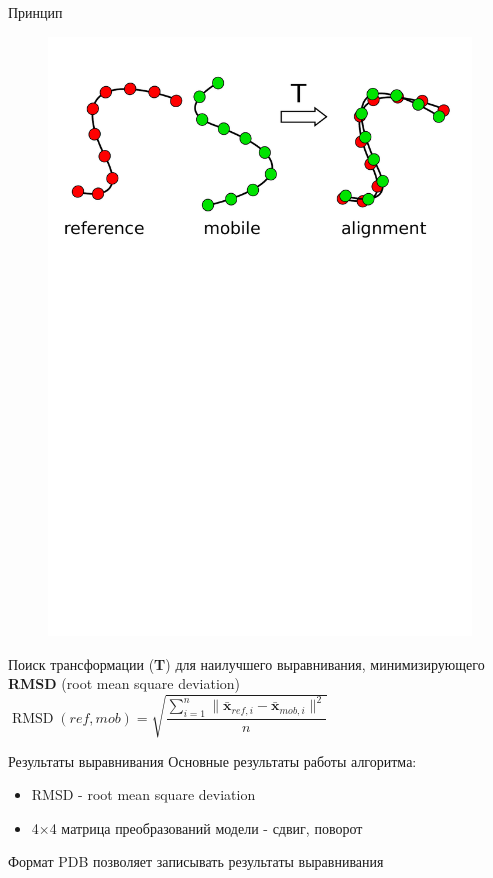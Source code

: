 \documentclass[utf8, professionalfonts]{beamer}
\begin{document}
\begin{frame}{Принцип}
\begin{figure}[h]
    \includegraphics[clip, trim=0 19.5cm 0 1cm, width=\linewidth]{method.pdf}
\end{figure}

Поиск трансформации ({\bf T}) для наилучшего выравнивания, минимизирующего {\bf RMSD} (root mean square deviation)
$ \operatorname{RMSD}(ref, mob) = \sqrt{ \dfrac{\sum_{i=1}^n \| \mathbf{\bar{x}}_{ref,i} -  \mathbf{\bar{x}}_{mob,i} \| ^2} {n} } $

\end{frame}

\begin{frame}{Результаты выравнивания}
Основные результаты работы алгоритма:
\begin{itemize}
	\item RMSD - root mean square deviation
	\item 4$\times$4 матрица преобразований модели - сдвиг, поворот
\end{itemize}	
\vspace{11pt}

Формат PDB позволяет записывать результаты выравнивания
\end{frame}
\end{document}
